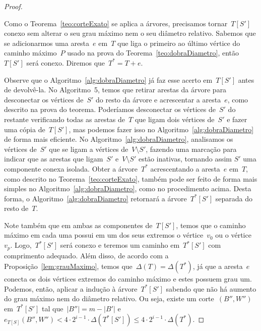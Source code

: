 \begin{proof}
\begin{center}
\begin{tikzpicture}
			\end{tikzpicture} \end{center}
			Como o Teorema~\ref{teo:corteExato} se aplica a 
			árvores, precisamos tornar~$T[S']$ conexo sem
			alterar o seu grau máximo nem o seu diâmetro relativo.
			Sabemos que se adicionarmos uma aresta~$e$ em~$T$ que 
			liga o primeiro ao último vértice do caminho máximo~$P$
			usado na prova do Teorema~\ref{teo:dobraDiametro},
			então~$T[S']$ será conexo. 
			Diremos que~${T^* = T+ e}$.

			Observe que o Algoritmo~\ref{alg:dobraDiametro} já faz
			esse acerto em~$T[S']$ antes de devolvê-la.
			No Algoritmo~5, temos que 
			retirar arestas da árvore para 
			desconectar os vértices de~$S'$ do resto da árvore
			e acrescentar a aresta~$e$, como descrito na prova do teorema.
			Poderíamos desconectar os vértices 
			de~$S'$ do restante
			verificando todas as arestas de~$T$ que 
			ligam dois vértices de~$S'$ e fazer uma cópia de~$T[S']$, mas podemos
			fazer isso no Algoritmo~\ref{alg:dobraDiametro} de forma 
			mais eficiente. 
			No Algoritmo~\ref{alg:dobraDiametro},
			analisamos os vértices de~$S'$ que se ligam a vértices 
			de~$V\setminus S'$, fazendo
			uma marcação para indicar que as 
			arestas que ligam~$S'$ e~${V\setminus S'}$ estão inativas, 
			tornando assim $S'$ uma componente conexa isolada. 
			Obter a árvore~$T^*$ acrescentando a aresta~$e$ em~$T$, como descrito no
			Teorema~\ref{teo:corteExato}, também pode ser feito de 
			forma mais simples no Algoritmo~\ref{alg:dobraDiametro},
			como no procedimento acima.
			Desta forma, o Algoritmo~\ref{alg:dobraDiametro} retornará
			a árvore~$T^*[S']$ separada do resto de~$T$.

			Note também que em ambas as componentes de~$T[S']$, 
			temos que o caminho máximo em cada uma possui em um dos
			seus extremos o vértice~$v_0$ ou o vértice~$v_p$.
			Logo,~$T^*[S']$ será conexo e 
			teremos um caminho
			em~$T^*[S']$ com comprimento adequado.
			Além disso, de acordo com a Proposição~\ref{lem:grauMaximo}, 
			temos que~${\Delta(T) = \Delta(T^*)}$, já que a aresta~$e$ 
			conecta os dois vértices extremos do caminho máximo
			e estes possuem grau um.
			Podemos, então, aplicar a indução à árvore~$T^*[S']$ 
			sabendo que não há aumento
			do grau máximo nem do diâmetro relativo.
			Ou seja,
			existe um corte~$(B'',W'')$ em~$T^*[S']$
			tal que~${|B''|=m-|B'|}$ 
			e~${e_{T[S]}(B'',W'')< 4\cdot 2^{i-1}\cdot
			\Delta(T^*[S'])\le 4\cdot 2^{i-1}\cdot\Delta(T^*)}$.


\end{proof}
